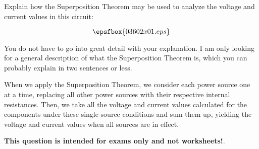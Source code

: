 

Explain how the Superposition Theorem may be used to analyze the voltage and current values in this circuit:

$$\epsfbox{03602x01.eps}$$

You do not have to go into great detail with your explanation.  I am only looking for a general description of what the Superposition Theorem is, which you can probably explain in two sentences or less.

\vskip 50pt







When we apply the Superposition Theorem, we consider each power source one at a time, replacing all other power sources with their respective internal resistances.  Then, we take all the voltage and current values calculated for the components under these single-source conditions and sum them up, yielding the voltage and current values when all sources are in effect.







{\bf This question is intended for exams only and not worksheets!}.



